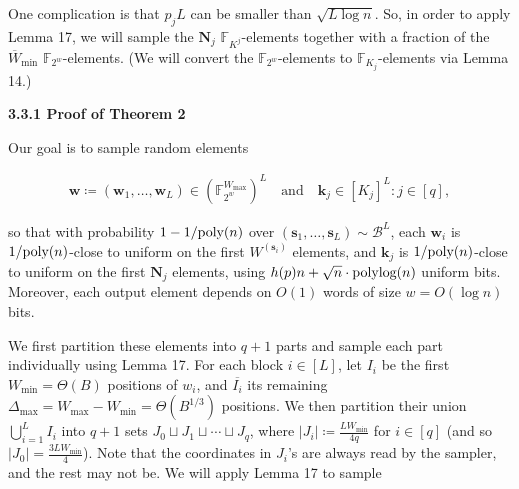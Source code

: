 \documentclass[10pt,a4paper]{article}
\begin{document}
One complication is that $p_{j}L$ can be smaller than $\sqrt{L\log n}$.
So, in order to apply Lemma 17, we will sample the $\boldsymbol{N}_{j}$ $\mathbb{F}_{K^{j}}$-elements together with a fraction of the $\overline{W}_{\min}$ $\mathbb{F}_{2^{w}}$-elements.
(We will convert the $\mathbb{F}_{2^{w}}$-elements to $\mathbb{F}_{K_{j}}$-elements via Lemma 14.)\par




\par\medskip\noindent\textbf{
3.3.1 Proof of Theorem 2
}\par




Our goal is to sample random elements\par


\[\begin{gathered}
\boldsymbol{w}\coloneq(\boldsymbol{w}_{1},\ldots,\boldsymbol{w}_{L})\in(\mathbb{F}_{2^{w}}^{W_{\max}})^{L}\quad\text{and}\quad\boldsymbol{k}_{j}\in[K_{j}]^{L}:j\in[q],
\end{gathered}\]


so that with probability $1-1/\textnormal{poly}(n)$ over $(\boldsymbol{s}_{1},\ldots,\boldsymbol{s}_{L})\sim\mathcal{B}^{L}$, each $\boldsymbol{w}_{i}$ is $1/\textnormal{poly}(n)$-close to uniform on the first $W^{(\boldsymbol{s}_{i})}$ elements, and $\boldsymbol{k}_{j}$ is $1/\textnormal{poly}(n)$-close to uniform on the first $\boldsymbol{N}_{j}$ elements, using $h(p)n+\sqrt{n}\cdot\textnormal{polylog}(n)$ uniform bits.
Moreover, each output element depends on $O(1)$ words of size $w=O(\log n)$ bits.\par




We first partition these elements into $q+1$ parts and sample each part individually using Lemma 17.
For each block $i\in[L]$, let $I_{i}$ be the first $W_{\min}=\Theta(B)$ positions of $w_{i}$, and $\overline{I_{i}}$ its remaining $\Delta_{\max}=W_{\max}-W_{\min}=\Theta(B^{1/3})$ positions.
We then partition their union $\bigcup_{i=1}^{L}I_{i}$ into $q+1$ sets $J_{0}\sqcup J_{1}\sqcup\cdots\sqcup J_{q}$, where $\lvert J_{i}\rvert\coloneq\frac{LW_{\min}}{4q}$ for $i\in[q]$ (and so $\lvert J_{0}\rvert=\frac{3LW_{\min}}{4}$).
Note that the coordinates in $J_{i}$’s are always read by the sampler, and the rest may not be.
We will apply Lemma 17 to sample\par
\end{document}
